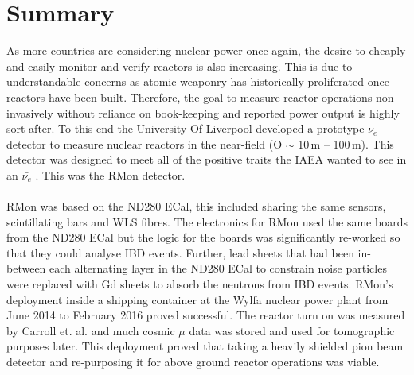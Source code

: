 
\chapter{Summary}

\ifpdf
    \graphicspath{{Chapter7/Figs/Raster/}{Chapter6/Figs/PDF/}{Chapter6/Figs/}}
\else
    \graphicspath{{Chapter7/Figs/Vector/}{Chapter7/Figs/}}
\fi

As more countries are considering nuclear power once again, the desire to cheaply and easily monitor and verify reactors is also increasing. This is due to understandable concerns as atomic weaponry has historically proliferated once reactors have been built. Therefore, the goal to measure reactor operations non-invasively without reliance on book-keeping and reported power output is highly sort after. To this end the University Of Liverpool developed a prototype $\bar{\nu_e}$ detector to measure nuclear reactors in the near-field (O $\sim$ 10\,m -- 100\,m). This detector was designed to meet all of the positive traits the IAEA wanted to see in an $\bar{\nu_e}$ \cite{IAEA_2008}. This was the RMon detector. 
\\\\RMon was based on the ND280 ECal, this included sharing the same sensors, scintillating bars and WLS fibres. The electronics for RMon used the same boards from the ND280 ECal but the logic for the boards was significantly re-worked so that they could analyse IBD events. Further, lead sheets that had been in-between each alternating layer in the ND280 ECal to constrain noise particles were replaced with Gd sheets to absorb the neutrons from IBD events. RMon's deployment inside a shipping container at the Wylfa nuclear power plant from June 2014 to February 2016 proved successful. The reactor turn on was measured by Carroll et. al. \cite{Carroll_2018} and much cosmic $\mu$ data was stored and used for tomographic purposes later. This deployment proved that taking a heavily shielded pion beam detector and re-purposing it for above ground reactor operations was viable. 
